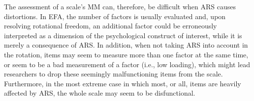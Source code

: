 \documentclass[a4paper,man,natbib]{apa6}
\begin{document}
\begin{linenumbers}
The assessment of a scale's MM can, therefore, be difficult when ARS causes distortions. In EFA, the number of factors is usually evaluated and, upon resolving rotational freedom, an additional factor could be erroneously interpreted as a dimension of the psychological construct of interest, while it is merely a consequence of ARS. In addition, when not taking ARS into account in the rotation, items may seem to measure more than one factor at the same time, or seem to be a bad measurement of a factor (i.e., low loading), which might lead researchers to drop these seemingly malfunctioning items from the scale.  Furthermore, in the most extreme case in which most, or all, items are heavily affected by ARS, the whole scale may seem to be disfunctional. 




\end{linenumbers}
\end{document}
